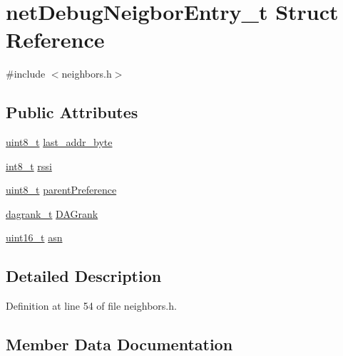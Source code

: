 \hypertarget{structnet_debug_neigbor_entry__t}{}\section{net\+Debug\+Neigbor\+Entry\+\_\+t Struct Reference}
\label{structnet_debug_neigbor_entry__t}


{\ttfamily \#include $<$neighbors.\+h$>$}

\subsection*{Public Attributes}
\begin{DoxyCompactItemize}
\item 
\hyperlink{_p_e___types_8h_aba7bc1797add20fe3efdf37ced1182c5}{uint8\+\_\+t} \hyperlink{structnet_debug_neigbor_entry__t_a40f416cf939cf5afff5a93f33f59a5c5}{last\+\_\+addr\+\_\+byte}
\item 
\hyperlink{_p_e___types_8h_aef44329758059c91c76d334e8fc09700}{int8\+\_\+t} \hyperlink{structnet_debug_neigbor_entry__t_a60fc35dde6926b216d6458b59416aa40}{rssi}
\item 
\hyperlink{_p_e___types_8h_aba7bc1797add20fe3efdf37ced1182c5}{uint8\+\_\+t} \hyperlink{structnet_debug_neigbor_entry__t_a091ad78edf8df0476cbf0cd40628b1b1}{parent\+Preference}
\item 
\hyperlink{opendefs_8h_a502861d0bb432f5702761bd854023e21}{dagrank\+\_\+t} \hyperlink{structnet_debug_neigbor_entry__t_a598ec07b40276860d689e9c792422881}{D\+A\+Grank}
\item 
\hyperlink{_p_e___types_8h_a1f1825b69244eb3ad2c7165ddc99c956}{uint16\+\_\+t} \hyperlink{structnet_debug_neigbor_entry__t_a165b554d93490830877a8866318aea04}{asn}
\end{DoxyCompactItemize}


\subsection{Detailed Description}


Definition at line 54 of file neighbors.\+h.



\subsection{Member Data Documentation}
